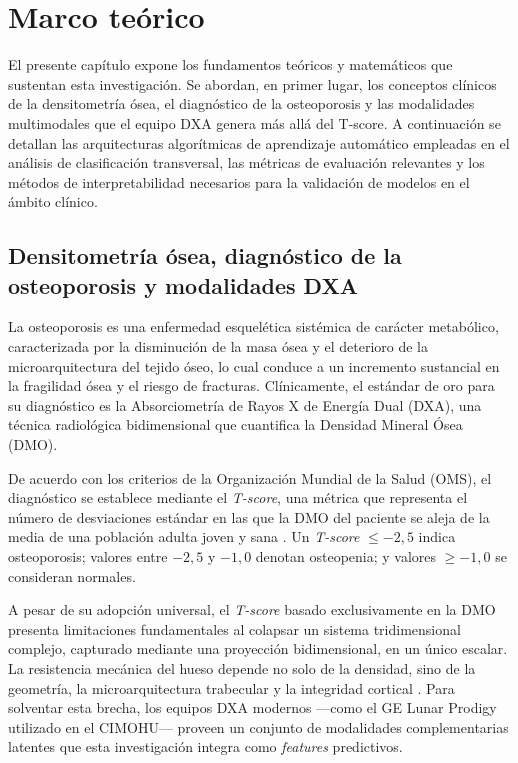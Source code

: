 \documentclass[../tesis.tex]{subfiles}
\begin{document}
\chapter{Marco teórico}
\label{chapter:marco}

El presente capítulo expone los fundamentos teóricos y matemáticos que sustentan esta investigación.
Se abordan, en primer lugar, los conceptos clínicos de la densitometría ósea, el diagnóstico de la
osteoporosis y las modalidades multimodales que el equipo DXA genera más allá del T-score.
A continuación se detallan las arquitecturas algorítmicas de aprendizaje automático empleadas en
el análisis de clasificación transversal, las métricas de evaluación relevantes y los métodos de
interpretabilidad necesarios para la validación de modelos en el ámbito clínico.

\section{Densitometría ósea, diagnóstico de la osteoporosis y modalidades DXA}
\label{sec:densitometria}

La osteoporosis es una enfermedad esquelética sistémica de carácter metabólico, caracterizada por
la disminución de la masa ósea y el deterioro de la microarquitectura del tejido óseo, lo cual
conduce a un incremento sustancial en la fragilidad ósea y el riesgo de fracturas.
Clínicamente, el estándar de oro para su diagnóstico es la Absorciometría de Rayos X de Energía
Dual (DXA), una técnica radiológica bidimensional que cuantifica la Densidad Mineral Ósea (DMO).

De acuerdo con los criterios de la Organización Mundial de la Salud (OMS), el diagnóstico se
establece mediante el \textit{T-score}, una métrica que representa el número de desviaciones
estándar en las que la DMO del paciente se aleja de la media de una población adulta joven y sana
\cite{WHO1994}.
Un \textit{T-score} $\leq -2{,}5$ indica osteoporosis; valores entre $-2{,}5$ y $-1{,}0$ denotan
osteopenia; y valores $\geq -1{,}0$ se consideran normales.

A pesar de su adopción universal, el \textit{T-score} basado exclusivamente en la DMO presenta
limitaciones fundamentales al colapsar un sistema tridimensional complejo, capturado mediante una
proyección bidimensional, en un único escalar.
La resistencia mecánica del hueso depende no solo de la densidad, sino de la geometría, la
microarquitectura trabecular y la integridad cortical \parencite{AibarAlmazan2022}.
Para solventar esta brecha, los equipos DXA modernos ---como el GE Lunar Prodigy utilizado en
el CIMOHU--- proveen un conjunto de modalidades complementarias latentes que esta investigación
integra como \textit{features} predictivos.
\end{document}

